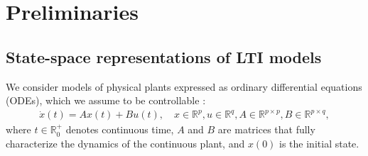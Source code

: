 \documentclass[sigconf]{llncs}
\newcommand{\mat}[1]{{#1}}
\renewcommand{\vec}[1]{{#1}}
\begin{document}
\section{Preliminaries}
\label{sec:preliminaries}

\subsection{State-space representations of LTI models}
\label{sec:model}


We consider models of physical plants expressed as ordinary differential
equations (ODEs), which we assume to be controllable \cite{Astrom08,astrom1997computer}:
%
\begin{align}
\label{eq:ode1}
\dot{x}(t) = \mat{A}\vec{x}(t)+ \mat{B} \vec{u}(t), \quad \vec{x} \in \mathbb{R}^p, \vec{u} \in \mathbb{R}^q, \mat{A} \in \mathbb{R}^{p \times p}, \mat{B} \in \mathbb{R}^{p \times q},
\end{align}
%
where $t \in \mathbb R_0^+$ denotes continuous time, 
$\mat{A}$ and $\mat{B}$ are matrices that fully characterize the dynamics of the continuous plant, 
and $x(0)$ is the initial state. 
\end{document}
